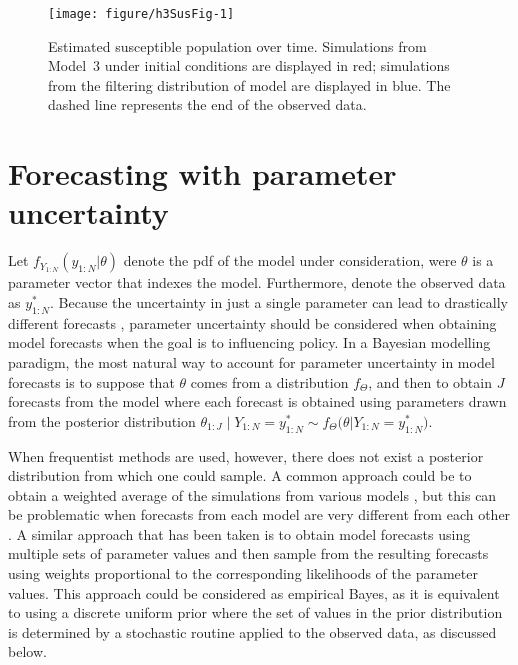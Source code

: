 \begin{figure}[!ht]
\begin{knitrout}
\color{fgcolor}
\texttt{[image: figure/h3SusFig-1]} 
\end{knitrout}
\caption[Estimated susceptible population over time.]{\label{fig:h3Sus}Estimated susceptible population over time.
Simulations from Model~3 under initial conditions are displayed in red; simulations from the filtering distribution of model are displayed in blue.
The dashed line represents the end of the observed data.}
\end{figure}

\section{Forecasting with parameter uncertainty}\label{sec:appendix_haiti_uncertain}

Let $f_{Y_{1:N}}(y_{1:N} | \theta)$ denote the pdf of the model under consideration, were $\theta$ is a parameter vector that indexes the model.
Furthermore, denote the observed data as $y_{1:N}^*$.
Because the uncertainty in just a single parameter can lead to drastically different forecasts \cite{saltelli20},
parameter uncertainty should be considered when obtaining model forecasts when the goal is to influencing policy.
In a Bayesian modelling paradigm, the most natural way to account for parameter uncertainty in model forecasts is to suppose that $\theta$ comes from a distribution $f_{\Theta}$, and then to obtain $J$ forecasts from the model where each forecast is obtained using parameters drawn from the posterior distribution $\theta_{1:J} \mid Y_{1:N} = y_{1:N}^* \sim f_{\Theta}\big(\theta | Y_{1:N} = y_{1:N}^*\big)$.

When frequentist methods are used, however, there does not exist a posterior distribution from which one could sample.
A common approach could be to obtain a weighted average of the simulations from various models \cite{hoeting99}, but this can be problematic when forecasts from each model are very different from each other \cite{grueber11}.
A similar approach that has been taken \cite{king15} is to obtain model forecasts using multiple sets of parameter values and then sample from the resulting forecasts using weights proportional to the corresponding likelihoods of the parameter values.
This approach could be considered as empirical Bayes, as it is equivalent to using a discrete uniform prior where the set of values in the prior distribution is determined by a stochastic routine applied to the observed data, as discussed below.

